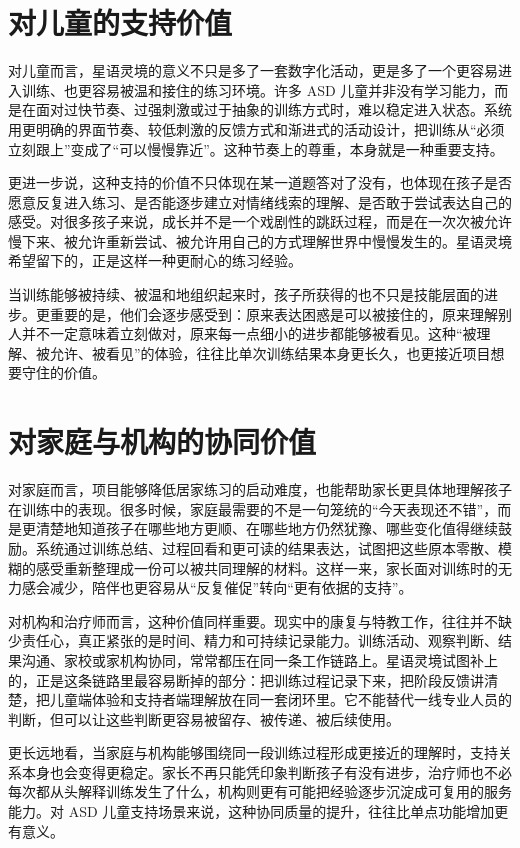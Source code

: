 \section{对儿童的支持价值}
对儿童而言，星语灵境的意义不只是多了一套数字化活动，更是多了一个更容易进入训练、也更容易被温和接住的练习环境。许多 ASD 儿童并非没有学习能力，而是在面对过快节奏、过强刺激或过于抽象的训练方式时，难以稳定进入状态。系统用更明确的界面节奏、较低刺激的反馈方式和渐进式的活动设计，把训练从“必须立刻跟上”变成了“可以慢慢靠近”。这种节奏上的尊重，本身就是一种重要支持。

更进一步说，这种支持的价值不只体现在某一道题答对了没有，也体现在孩子是否愿意反复进入练习、是否能逐步建立对情绪线索的理解、是否敢于尝试表达自己的感受。对很多孩子来说，成长并不是一个戏剧性的跳跃过程，而是在一次次被允许慢下来、被允许重新尝试、被允许用自己的方式理解世界中慢慢发生的。星语灵境希望留下的，正是这样一种更耐心的练习经验。

当训练能够被持续、被温和地组织起来时，孩子所获得的也不只是技能层面的进步。更重要的是，他们会逐步感受到：原来表达困惑是可以被接住的，原来理解别人并不一定意味着立刻做对，原来每一点细小的进步都能够被看见。这种“被理解、被允许、被看见”的体验，往往比单次训练结果本身更长久，也更接近项目想要守住的价值。

\section{对家庭与机构的协同价值}
对家庭而言，项目能够降低居家练习的启动难度，也能帮助家长更具体地理解孩子在训练中的表现。很多时候，家庭最需要的不是一句笼统的“今天表现还不错”，而是更清楚地知道孩子在哪些地方更顺、在哪些地方仍然犹豫、哪些变化值得继续鼓励。系统通过训练总结、过程回看和更可读的结果表达，试图把这些原本零散、模糊的感受重新整理成一份可以被共同理解的材料。这样一来，家长面对训练时的无力感会减少，陪伴也更容易从“反复催促”转向“更有依据的支持”。

对机构和治疗师而言，这种价值同样重要。现实中的康复与特教工作，往往并不缺少责任心，真正紧张的是时间、精力和可持续记录能力。训练活动、观察判断、结果沟通、家校或家机构协同，常常都压在同一条工作链路上。星语灵境试图补上的，正是这条链路里最容易断掉的部分：把训练过程记录下来，把阶段反馈讲清楚，把儿童端体验和支持者端理解放在同一套闭环里。它不能替代一线专业人员的判断，但可以让这些判断更容易被留存、被传递、被后续使用。

更长远地看，当家庭与机构能够围绕同一段训练过程形成更接近的理解时，支持关系本身也会变得更稳定。家长不再只能凭印象判断孩子有没有进步，治疗师也不必每次都从头解释训练发生了什么，机构则更有可能把经验逐步沉淀成可复用的服务能力。对 ASD 儿童支持场景来说，这种协同质量的提升，往往比单点功能增加更有意义。

